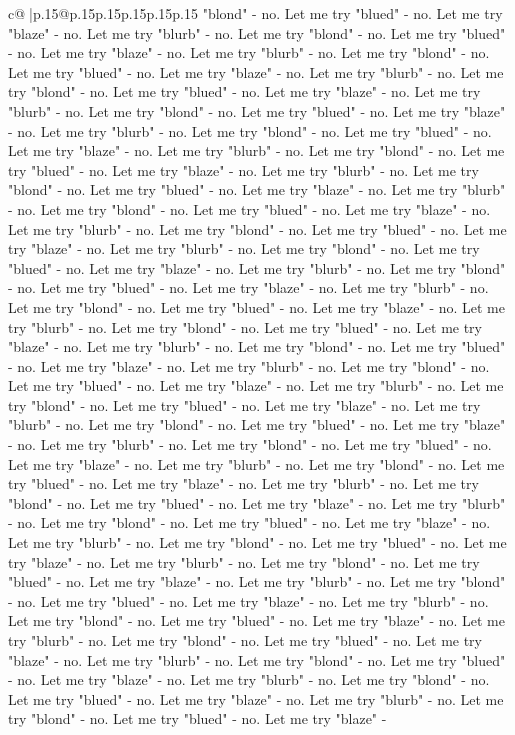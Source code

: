 \documentclass{article}
\begin{document}
{\begin{supertabular}{c@{$\;$}|p{.15\linewidth}@{}p{.15\linewidth}p{.15\linewidth}p{.15\linewidth}p{.15\linewidth}p{.15\linewidth}}
{{{"blond" {-} no. Let me try "blued" {-} no. Let me try "blaze" {-} no. Let me try "blurb" {-} no. Let me try "blond" {-} no. Let me try "blued" {-} no. Let me try "blaze" {-} no. Let me try "blurb" {-} no. Let me try "blond" {-} no. Let me try "blued" {-} no. Let me try "blaze" {-} no. Let me try "blurb" {-} no. Let me try "blond" {-} no. Let me try "blued" {-} no. Let me try "blaze" {-} no. Let me try "blurb" {-} no. Let me try "blond" {-} no. Let me try "blued" {-} no. Let me try "blaze" {-} no. Let me try "blurb" {-} no. Let me try "blond" {-} no. Let me try "blued" {-} no. Let me try "blaze" {-} no. Let me try "blurb" {-} no. Let me try "blond" {-} no. Let me try "blued" {-} no. Let me try "blaze" {-} no. Let me try "blurb" {-} no. Let me try "blond" {-} no. Let me try "blued" {-} no. Let me try "blaze" {-} no. Let me try "blurb" {-} no. Let me try "blond" {-} no. Let me try "blued" {-} no. Let me try "blaze" {-} no. Let me try "blurb" {-} no. Let me try "blond" {-} no. Let me try "blued" {-} no. Let me try "blaze" {-} no. Let me try "blurb" {-} no. Let me try "blond" {-} no. Let me try "blued" {-} no. Let me try "blaze" {-} no. Let me try "blurb" {-} no. Let me try "blond" {-} no. Let me try "blued" {-} no. Let me try "blaze" {-} no. Let me try "blurb" {-} no. Let me try "blond" {-} no. Let me try "blued" {-} no. Let me try "blaze" {-} no. Let me try "blurb" {-} no. Let me try "blond" {-} no. Let me try "blued" {-} no. Let me try "blaze" {-} no. Let me try "blurb" {-} no. Let me try "blond" {-} no. Let me try "blued" {-} no. Let me try "blaze" {-} no. Let me try "blurb" {-} no. Let me try "blond" {-} no. Let me try "blued" {-} no. Let me try "blaze" {-} no. Let me try "blurb" {-} no. Let me try "blond" {-} no. Let me try "blued" {-} no. Let me try "blaze" {-} no. Let me try "blurb" {-} no. Let me try "blond" {-} no. Let me try "blued" {-} no. Let me try "blaze" {-} no. Let me try "blurb" {-} no. Let me try "blond" {-} no. Let me try "blued" {-} no. Let me try "blaze" {-} no. Let me try "blurb" {-} no. Let me try "blond" {-} no. Let me try "blued" {-} no. Let me try "blaze" {-} no. Let me try "blurb" {-} no. Let me try "blond" {-} no. Let me try "blued" {-} no. Let me try "blaze" {-} no. Let me try "blurb" {-} no. Let me try "blond" {-} no. Let me try "blued" {-} no. Let me try "blaze" {-} no. Let me try "blurb" {-} no. Let me try "blond" {-} no. Let me try "blued" {-} no. Let me try "blaze" {-} no. Let me try "blurb" {-} no. Let me try "blond" {-} no. Let me try "blued" {-} no. Let me try "blaze" {-} no. Let me try "blurb" {-} no. Let me try "blond" {-} no. Let me try "blued" {-} no. Let me try "blaze" {-} no. Let me try "blurb" {-} no. Let me try "blond" {-} no. Let me try "blued" {-} no. Let me try "blaze" {-} no. Let me try "blurb" {-} no. Let me try "blond" {-} no. Let me try "blued" {-} no. Let me try "blaze" {-} no. Let me try "blurb" {-} no. Let me try "blond" {-} no. Let me try "blued" {-} no. Let me try "blaze" {-} no. Let me try "blurb" {-} no. Let me try "blond" {-} no. Let me try "blued" {-} no. Let me try "blaze" {-} no. Let me try "blurb" {-} no. Let me try "blond" {-} no. Let me try "blued" {-} no. Let me try "blaze" {-} }}}
\end{supertabular}}
\end{document}
